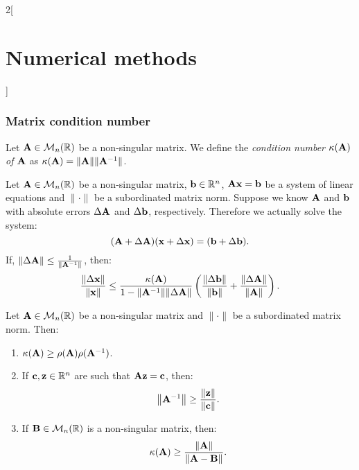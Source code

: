 \documentclass[../../../main.tex]{subfiles}
\begin{document}
\begin{multicols}{2}[\section{Numerical methods}]
\subsubsection*{Matrix condition number}
\begin{definition}
    Let $\vb{A}\in\mathcal{M}_n(\mathbb{R})$ be a non-singular matrix. We define the \textit{condition number $\kappa(\vb{A})$ of $\vb{A}$} as $\kappa(\vb{A})=\|\vb{A}\|\|\vb{A}^{-1}\|$.
\end{definition}
\begin{theorem}
    Let $\vb{A}\in\mathcal{M}_n(\mathbb{R})$ be a non-singular matrix, $\vb{b}\in\mathbb{R}^n$, $\vb{A}\vb{x}=\vb{b}$ be a system of linear equations and $\|\cdot\|$ be a subordinated matrix norm. Suppose we know $\vb{A}$ and $\vb{b}$ with absolute errors $\Delta\vb{A}$ and $\Delta\vb{b}$, respectively. Therefore we actually solve the system: $$(\vb{A}+\Delta\vb{A})(\vb{x}+\Delta \vb{x})=(\vb{b}+\Delta\vb{b}).$$ If, $\|\Delta\vb{A}\|\leq\frac{1}{\|\vb{A}^{-1}\|}$, then: $$\frac{\|\Delta \vb{x}\|}{\|\vb{x}\|}\leq\frac{\kappa(\vb{A})}{1-\norm{\vb{A}^{-1}}\norm{\Delta\vb{A}}}\left(\frac{\norm{\Delta\vb{b}}}{\norm{\vb{b}}}+\frac{\norm{\Delta\vb{A}}}{\norm{\vb{A}}}\right).$$
\end{theorem}
\begin{theorem}
    Let $\vb{A}\in\mathcal{M}_n(\mathbb{R})$ be a non-singular matrix and $\|\cdot\|$ be a subordinated matrix norm. Then:
    \begin{enumerate}
        \item $\kappa(\vb{A})\geq\rho(\vb{A})\rho(\vb{A}^{-1})$.
        \item If $\vb{c},\vb{z}\in\mathbb{R}^n$ are such that $\vb{A}\vb{z}=\vb{c}$, then: $$\norm{\vb{A}^{-1}}\geq\frac{\norm{\vb{z}}}{\norm{\vb{c}}}.$$
        \item If $\vb{B}\in\mathcal{M}_n(\mathbb{R})$ is a non-singular matrix, then: $$\kappa(\vb{A})\geq\frac{\norm{\vb{A}}}{\norm{\vb{A}-\vb{B}}}.$$
    \end{enumerate}
\end{theorem}

\end{multicols}
\end{document}
